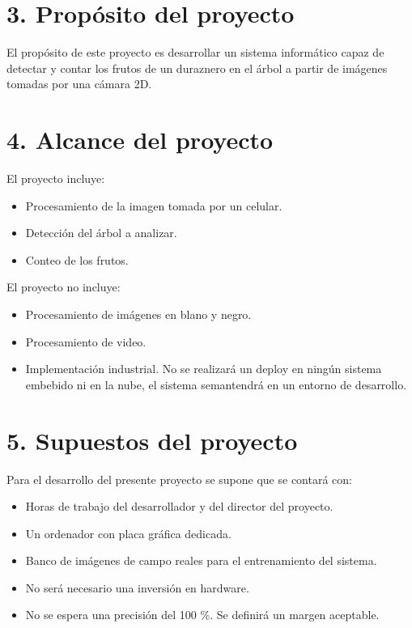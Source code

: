 \documentclass[
11pt %
]{charter}
\begin{document}
\section{3. Propósito del proyecto}
\label{sec:proposito}

El propósito de este proyecto es desarrollar un sistema informático capaz de detectar y contar los frutos de un duraznero en el árbol a partir de imágenes tomadas por una cámara 2D.

\section{4. Alcance del proyecto}
\label{sec:alcance}


El proyecto incluye:
\begin{itemize}
	\item Procesamiento de la imagen tomada por un celular.
	\item Detección del árbol a analizar.
	\item Conteo de los frutos.
\end{itemize}

El proyecto no incluye:
\begin{itemize}
	\item Procesamiento de imágenes en blano y negro.
	\item Procesamiento de video.
	\item Implementación industrial. No se realizará un deploy en ningún sistema embebido ni en la nube, el sistema semantendrá en un entorno de desarrollo.
\end{itemize}


\section{5. Supuestos del proyecto}
\label{sec:supuestos}

Para el desarrollo del presente proyecto se supone que se contará con:

\begin{itemize}
    \item Horas de trabajo del desarrollador y del director del proyecto.
	\item Un ordenador con placa gráfica dedicada.
	\item Banco de imágenes de campo reales para el entrenamiento del sistema.
	\item No será necesario una inversión en hardware.
	\item No se espera una precisión del 100 \%. Se definirá un margen aceptable.
\end{itemize}
\end{document}
